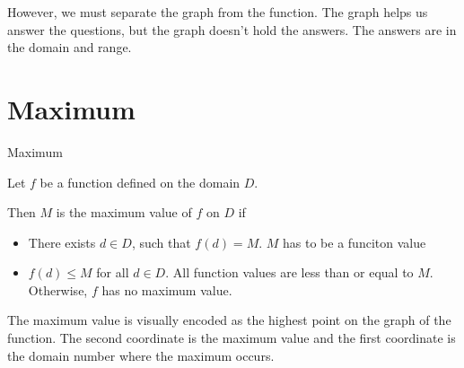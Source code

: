 \documentclass{ximera}
\begin{document}
However, we must separate the graph from the function.  The graph helps us answer the questions, but the graph doesn't hold the answers.  The answers are in the domain and range. 





\section{Maximum}



\begin{definition} Maximum


Let $f$ be a function defined on the domain $D$.

Then $M$ is the maximum value of $f$ on $D$ if    


\begin{itemize}
\item There exists $d \in D$, such that $f(d) = M$.   $M$ has to be a funciton value \\

\item $f(d) \leq M$ for all $d \in D$. All function values are less than or equal to $M$. Otherwise, $f$ has no maximum value.

\end{itemize}


\end{definition}

\vspace{0.5in}



The maximum value is visually encoded as the highest point on the graph of the function.  The second coordinate is the maximum value and the first coordinate is the domain number where the maximum occurs.
\end{document}

